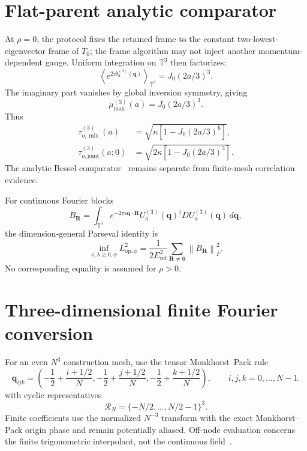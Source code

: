 \documentclass[11pt]{article}
\newcommand{\norm}[1]{\left\lVert #1\right\rVert}
\newcommand{\T}{\mathbb T}
\begin{document}
\section{Flat-parent analytic comparator}

At $\rho=0$, the protocol fixes the retained frame to the constant two-lowest-eigenvector
frame of $T_0$; the frame algorithm may not inject another momentum-dependent gauge.
Uniform integration on $\T^3$ then factorizes:
\begin{equation}
 \left\langle e^{2i\theta_a^{(3)}(\mathbf q)}\right\rangle_{\T^3}
 =J_0(2a/3)^3.
\end{equation}
The imaginary part vanishes by global inversion symmetry, giving
\begin{equation}
 \mu_{\max}^{(3)}(a)=J_0(2a/3)^3.
 \label{eq:flat-correlation}
\end{equation}
Thus
\begin{align}
 \tau_{o,\min}^{(3)}(a)
 &=\sqrt{\kappa\left[1-J_0(2a/3)^6\right]},\\
 \tau_{o,\mathrm{joint}}^{(3)}(a;0)
 &=\sqrt{2\kappa\left[1-J_0(2a/3)^3\right]}.
\end{align}
The analytic Bessel comparator~\cite{dlmf1012} remains separate from finite-mesh
correlation evidence.

For continuous Fourier blocks
\begin{equation}
 B_{\mathbf R}=\int_{\T^3}e^{-2\pi i\mathbf q\cdot\mathbf R}
 U_a^{(3)}(\mathbf q)^\dagger D U_a^{(3)}(\mathbf q)\,d\mathbf q,
\end{equation}
the dimension-general Parseval identity is
\begin{equation}
 \inf_{s,\lambda\ge0,\phi}L_{\mathrm{op},\phi}^2
 =\frac{1}{2E_{\mathrm{ref}}^2}
  \sum_{\mathbf R\ne\mathbf0}\norm{B_{\mathbf R}}_F^2.
 \label{eq:flat-locality}
\end{equation}
No corresponding equality is assumed for $\rho>0$.

\section{Three-dimensional finite Fourier conversion}

For an even $N^3$ construction mesh, use the tensor Monkhorst--Pack rule
\begin{equation}
 \mathbf q_{ijk}=
 \left(-\frac12+\frac{i+1/2}{N},
       -\frac12+\frac{j+1/2}{N},
       -\frac12+\frac{k+1/2}{N}\right),
 \qquad i,j,k=0,\ldots,N-1.
\end{equation}
with cyclic representatives
\begin{equation}
 \mathcal R_N=\{-N/2,\ldots,N/2-1\}^3.
\end{equation}
Finite coefficients use the normalized $N^{-3}$ transform with the exact Monkhorst--
Pack origin phase and remain potentially aliased. Off-node evaluation concerns the finite
trigonometric interpolant, not the
continuous field~\cite{trefethen2000,higham2002}.
\end{document}

